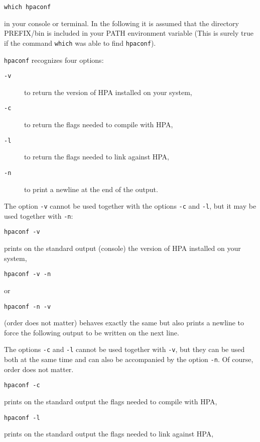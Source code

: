 \documentclass{article}
\begin{document}
\begin{verbatim}
which hpaconf
\end{verbatim}
in your console or terminal.
In the following it is assumed that the directory PREFIX/bin
is included in your PATH environment variable (This is surely
true if the command \texttt{which} was able to find \texttt{hpaconf}).  

\texttt{hpaconf} recognizes four options:

\begin{description}
\item[\texttt{-v} ]
  to return the version of HPA installed on your system,
\item[\texttt{-c} ]
  to return the flags needed to compile with HPA,
\item[\texttt{-l} ]
  to return the flags needed to link against HPA,
\item[\texttt{-n} ]
  to print a newline at the end of the output.
\end{description}

The option \texttt{-v} cannot be used together with the options \texttt{-c} and \texttt{-l},
but it may be used together with \texttt{-n}:

\begin{verbatim}
hpaconf -v
\end{verbatim}
prints on the standard output (console) 
the version of HPA installed on your system,

\begin{verbatim}
hpaconf -v -n 
\end{verbatim}
or 

\begin{verbatim}
hpaconf -n -v
\end{verbatim}
(order does not matter) behaves exactly the same but 
also prints a newline to force the following output to be written on the next line.

The options \texttt{-c} and \texttt{-l} cannot be used together with \texttt{-v}, but they 
can be used both at the same time and can also be accompanied by the option 
\texttt{-n}. Of course, order does not matter.

\begin{verbatim}
hpaconf -c
\end{verbatim}
prints on the standard output the flags needed to compile with HPA,

\begin{verbatim}
hpaconf -l
\end{verbatim}
prints on the standard output the flags needed to link  against HPA,
\end{document}
